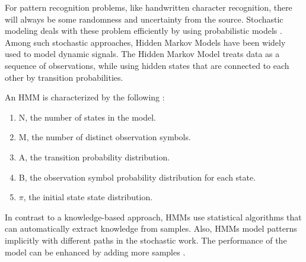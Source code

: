 
For pattern recognition problems, like handwritten character recognition, there will  always be some randomness and uncertainty from the source. 
Stochastic modeling deals with these problem efficiently by using probabilistic models \cite{Cho1995}.  
Among such stochastic approaches, Hidden Markov Models have been widely used to model dynamic signals.
The Hidden Markov Model treats data as a sequence of observations, while using hidden states that are connected to each other by transition probabilities.
 
An HMM is characterized by the following \cite{Rabiner1989}:
\begin{enumerate}
\item	N, the number of states in the model.
\item	M, the number of distinct observation symbols. %
\item	A, the transition probability distribution.
\item	B, the observation symbol probability distribution for each state.
\item	$\pi$, the initial state state distribution.
\end{enumerate}

In contrast to a knowledge-based approach, HMMs use statistical algorithms that can automatically extract knowledge from samples. 
Also, HMMs model patterns implicitly with different paths in the stochastic work. 
The performance of the model can be enhanced by adding more samples \cite{Cho1995}.
